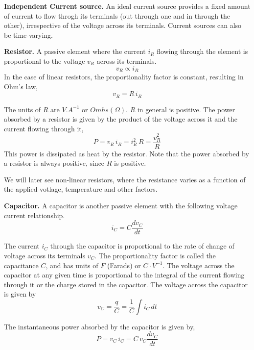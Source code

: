 \noindent \textbf{Independent Current source.} An ideal current source provides a fixed amount of current to flow throgh its terminals (out through one and in through the other), irrespective of the voltage across its terminals. Current sources can also be time-varying.

\noindent \textbf{Resistor.} A passive element where the current $i_R$ flowing through the element is proportional to the voltage $v_R$ across its terminals.
\[ v_R \propto i_R \]
In the case of linear resistors, the proportionality factor is constant, resulting in Ohm's law,
\begin{equation}
    v_R = R \, i_R
    \label{eq:02-01}
\end{equation}

The units of $R$ are $V.A^{-1}$ or $Omhs \left( \Omega \right)$. $R$ in general is positive. The power absorbed by a resistor is given by the product of the voltage across it and the current flowing through it, 
\begin{equation}
    P = v_R \, i_R = i_R^2 \, R = \frac{v_R^2}{R}
    \label{eq:02-02}
\end{equation}
This power is dissipated as heat by the resistor. Note that the power absorbed by a resistor is always positive, since $R$ is positive.

We will later see non-linear resistors, where the resistance varies as a function of the applied votlage, temperature and other factors. 

\noindent \textbf{Capacitor.} A capacitor is another passive element with the following voltage current relationship.
\begin{equation}
    i_C = C \frac{d v_C}{dt}
    \label{eq:02-03}
\end{equation}

The current $i_C$ through the capacitor is proportional to the rate of change of voltage across its terminals $v_C$. The proportionality factor is called the capacitance $C$, and has units of $F$ (Farads) or $C \cdot V^{-1}$. The voltage across the capacitor at any given time is proportional to the integral of the current flowing through it or the charge stored in the capacitor. The voltage across the capacitor is given by
\begin{equation}
    v_C = \frac{q}{C} = \frac{1}{C}\int i_C \, dt
    \label{eq:02-04}
\end{equation}

The instantaneous power absorbed by the capacitor is given by,
\begin{equation}
    P = v_C \, i_C = C \, v_C \frac{d v_C}{dt}
    \label{eq:02-05}
\end{equation}

